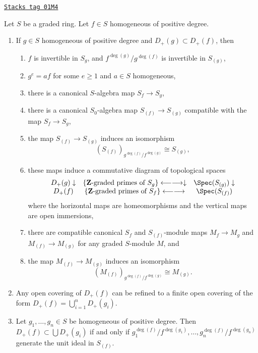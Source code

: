 \begin{lemma}
\label{constructions-lemma-standard-open}
\href{https://stacks.math.columbia.edu/tag/01M4}{\texttt{Stacks tag 01M4}}

Let $S$ be a graded ring. Let $f \in S$ homogeneous of positive degree.
\begin{enumerate}
\item If $g\in S$ homogeneous of positive degree
and $D_{+}(g) \subset D_{+}(f)$, then
\begin{enumerate}
\item $f$ is invertible in $S_g$, and
$f^{\deg(g)}/g^{\deg(f)}$ is invertible in $S_{(g)}$,
\item $g^e = af$ for some $e \geq 1$ and $a \in S$ homogeneous,
\item there is a canonical $S$-algebra map $S_f \to S_g$,
\item there is a canonical $S_0$-algebra map $S_{(f)} \to S_{(g)}$
compatible with the map $S_f \to S_g$,
\item the map $S_{(f)} \to S_{(g)}$ induces an isomorphism
$$
(S_{(f)})_{g^{\deg(f)}/f^{\deg(g)}} \cong S_{(g)},
$$
\item these maps induce a commutative diagram of
topological spaces
$$
\begin{array}{ccc}D_{+}(g) \downarrow & \{\mathbf{Z}\text{-graded primes of }S_g\} \longleftarrow\longrightarrow\downarrow & \Spec(S_{(g)}) \downarrow \\ D_{+}(f) & \{\mathbf{Z}\text{-graded primes of }S_f\} \longleftarrow\longrightarrow & \Spec(S_{(f)})\end{array}
$$
where the horizontal maps are homeomorphisms and the vertical maps
are open immersions,
\item there are compatible canonical $S_f$ and $S_{(f)}$-module
maps $M_f \to M_g$ and $M_{(f)} \to M_{(g)}$ for any graded $S$-module $M$,
and
\item the map $M_{(f)} \to M_{(g)}$ induces an isomorphism
$$
(M_{(f)})_{g^{\deg(f)}/f^{\deg(g)}} \cong M_{(g)}.
$$
\end{enumerate}
\item Any open covering of $D_{+}(f)$ can be refined to a finite
open covering of the form $D_{+}(f) = \bigcup_{i = 1}^n D_{+}(g_i)$.
\item Let $g_1, \ldots, g_n \in S$ be homogeneous of positive degree.
Then $D_{+}(f) \subset \bigcup D_{+}(g_i)$
if and only if
$g_1^{\deg(f)}/f^{\deg(g_1)}, \ldots, g_n^{\deg(f)}/f^{\deg(g_n)}$
generate the unit ideal in $S_{(f)}$.
\end{enumerate}
\end{lemma}

